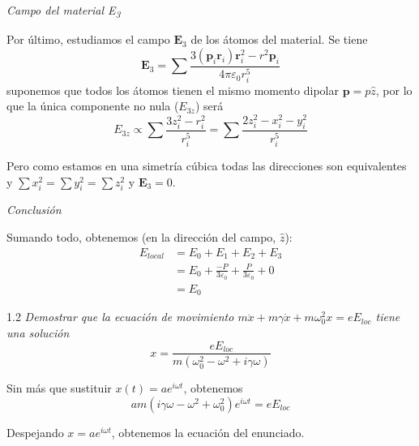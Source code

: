 \documentclass{tufte-book}
\begin{document}
\begin{flushright}
  \emph{Campo del material E\textsubscript{3}}
\end{flushright}

Por último, estudiamos el campo $\symbf{E}_3$ de los átomos del
material. Se tiene
\begin{equation}
  \symbf{E}_3 = \sum_{} \frac{3(\symbf{p}_i\symbf{r}_i)\symbf{r}_i^2-r^2 \symbf{p}_i}{4πε_0 r_i^5}
\end{equation}
suponemos que todos los átomos tienen el mismo momento dipolar
$\symbf{p} = p\hat{z}$, por lo
que la única componente no nula ($E_{3z}$) será
\begin{equation}
  E_{3z} ∝ \sum_{} \frac{3z_i^2 - r_i^2}{r_i^5} = \sum_{} \frac{2z_i^2
  -x_i^2 -y_i^2}{r_i^5}
\end{equation}

Pero como estamos en una simetría cúbica todas las direcciones son
equivalentes y $\sum x^2_i=\sum y^2_i=\sum
z^2_i$ y $\symbf{E}_{3} = 0$.

\begin{flushright}
  \emph{Conclusión}
\end{flushright}

Sumando todo, obtenemos (en la dirección del campo, $\hat{z}$):
\begin{equation}
  \begin{split}
    E_\mathit{local} & = E_0 + E_1 + E_2 + E_3\\
    & = E_0 + \frac{-P}{3ε_0} + \frac{P}{3ε_0} +0\\
    & = E_0
  \end{split}
\end{equation}

\begin{tcolorbox}[halign=left]
\lettrine[lines=2]{\color{ExerciseNumberColor}1.2}{}
  \emph{
    Demostrar que la ecuación de movimiento $m \ddot{x} + m γ \dot{x}
    + mω_0^2 x = eE_\mathit{loc}$ tiene una solución
  }
  \begin{equation*}
    x = \frac{eE_\mathit{loc}}{m(ω_0^2-ω^2+iγω)}
  \end{equation*}
\end{tcolorbox}


Sin más que sustituir $x(t)=a e^{iωt}$, obtenemos
\begin{equation}
a m \left(i γ ω - ω^{2} + ω_{0}^{2}\right) e^{i ω t} = e E_\mathit{loc}
\end{equation}

Despejando $x=a e^{iωt}$, obtenemos la ecuación del enunciado.
\end{document}
